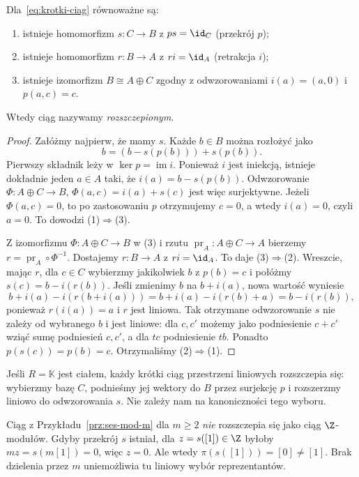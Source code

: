 \begin{twierdzenie}
\label{thm:ses-rozszczepienie}
Dla~\eqref{eq:krotki-ciag} równoważne są:
\begin{enumerate}[leftmargin=*]
\item istnieje homomorfizm $s:C\to B$
      z $p s=\id_C$ (przekrój $p$);
\item istnieje homomorfizm $r:B\to A$
      z $r i=\id_A$ (retrakcja $i$);
\item istnieje izomorfizm $B\cong A\oplus C$
      zgodny z odwzorowaniami $i(a)=(a,0)$
      i $p(a,c)=c$.
\end{enumerate}
Wtedy ciąg nazywamy \emph{rozszczepionym}.
\end{twierdzenie}
\begin{proof}
Załóżmy najpierw, że mamy $s$.
Każde $b\in B$ można rozłożyć jako
\[
 b=(b-s(p(b)))+s(p(b)).
\]
Pierwszy składnik leży w $\ker p=\operatorname{im}i$.
Ponieważ $i$ jest iniekcją, istnieje dokładnie
jeden $a\in A$ taki, że $i(a)=b-s(p(b))$.
Odwzorowanie
$\Phi:A\oplus C\to B$, $\Phi(a,c)=i(a)+s(c)$
jest więc surjektywne. Jeżeli $\Phi(a,c)=0$,
to po zastosowaniu $p$ otrzymujemy $c=0$,
a wtedy $i(a)=0$, czyli $a=0$.
To dowodzi (1)$\Rightarrow$(3).

Z izomorfizmu $\Phi:A\oplus C\to B$ w (3) i rzutu
$\operatorname{pr}_A:A\oplus C\to A$ bierzemy
$r=\operatorname{pr}_A\circ\Phi^{-1}$. Dostajemy
$r:B\to A$ z $ri=\id_A$. To daje (3)$\Rightarrow$(2).
Wreszcie, mając $r$, dla $c\in C$ wybierzmy
jakikolwiek $b$ z $p(b)=c$ i połóżmy
$s(c)=b-i(r(b))$. Jeśli zmienimy $b$ na
$b+i(a)$, nowa wartość wyniesie
\[
 b+i(a)-i(r(b+i(a)))
 =b+i(a)-i(r(b)+a)=b-i(r(b)),
\]
ponieważ $r(i(a))=a$ i $r$ jest liniowa.
Tak otrzymane odwzorowanie $s$ nie zależy od
wybranego $b$ i jest liniowe: dla $c,c'$
możemy jako podniesienie $c+c'$ wziąć sumę
podniesień $c,c'$, a dla $tc$ podniesienie $tb$.
Ponadto $p(s(c))=p(b)=c$.
Otrzymaliśmy (2)$\Rightarrow$(1).
\end{proof}

\begin{uwaga}
Jeśli $R=\mathbb K$ jest ciałem, każdy krótki
ciąg przestrzeni liniowych rozszczepia się:
wybierzmy bazę $C$, podnieśmy jej wektory
do $B$ przez surjekcję $p$ i rozszerzmy
liniowo do odwzorowania $s$. Nie zależy nam na
kanoniczności tego wyboru.

Ciąg z Przykładu~\ref{prz:ses-mod-m} dla
$m\geq2$ \emph{nie} rozszczepia się jako
ciąg $\Z$-modułów. Gdyby przekrój $s$
istniał, dla $z=s([1])\in\Z$ byłoby
$mz=s(m[1])=0$, więc $z=0$.
Ale wtedy $\pi(s([1]))=[0]\ne[1]$.
Brak dzielenia przez $m$ uniemożliwia tu
liniowy wybór reprezentantów.
\end{uwaga}
